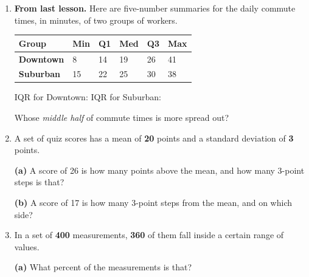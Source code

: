 \documentclass[12pt]{article}
\begin{document}

\vspace{0.12in}

\begin{enumerate}[leftmargin=1.7em, itemsep=0.13in]

  \item \textbf{From last lesson.} Here are five-number summaries for the daily commute times,
        in minutes, of two groups of workers.

        \vspace{3pt}
        \renewcommand{\arraystretch}{1.25}
        \begin{tabularx}{\linewidth}{@{} l Y Y Y Y Y @{}}
        \textbf{Group} & \textbf{Min} & \textbf{Q1} & \textbf{Med} & \textbf{Q3} & \textbf{Max} \\
        \hline
        \textbf{Downtown} & 8 & 14 & 19 & 26 & 41 \\
        \textbf{Suburban} & 15 & 22 & 25 & 30 & 38 \\
        \end{tabularx}
        \vspace{4pt}

        IQR for Downtown: \blank{2.0cm} \qquad IQR for Suburban: \blank{2.0cm}

        \vspace{3pt}
        Whose \emph{middle half} of commute times is more spread out? \blank{3.7cm}

  \item A set of quiz scores has a mean of \textbf{20} points and a standard deviation of
        \textbf{3} points.

        \vspace{3pt}
        \hspace{1.0em}\textbf{(a)} A score of 26 is how many points above the mean, and how many
        3-point steps is that? \blank{3.6cm}
        \vspace{3pt}

        \hspace{1.0em}\textbf{(b)} A score of 17 is how many 3-point steps from the mean, and on
        which side? \blank{4.3cm}

  \item In a set of \textbf{400} measurements, \textbf{360} of them fall inside a certain range
        of values.

        \vspace{3pt}
        \hspace{1.0em}\textbf{(a)} What percent of the measurements is that? \blank{2.0cm}
        \vspace{3pt}


\end{enumerate}
\end{document}
